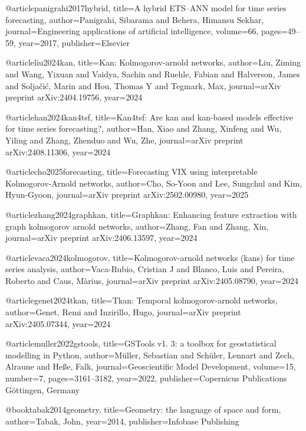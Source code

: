 @article{panigrahi2017hybrid,
  title={A hybrid ETS--ANN model for time series forecasting},
  author={Panigrahi, Sibarama and Behera, Himansu Sekhar},
  journal={Engineering applications of artificial intelligence},
  volume={66},
  pages={49--59},
  year={2017},
  publisher={Elsevier}
}

@article{liu2024kan,
  title={Kan: Kolmogorov-arnold networks},
  author={Liu, Ziming and Wang, Yixuan and Vaidya, Sachin and Ruehle, Fabian and Halverson, James and Solja{\v{c}}i{\'c}, Marin and Hou, Thomas Y and Tegmark, Max},
  journal={arXiv preprint arXiv:2404.19756},
  year={2024}
}

@article{han2024kan4tsf,
  title={Kan4tsf: Are kan and kan-based models effective for time series forecasting?},
  author={Han, Xiao and Zhang, Xinfeng and Wu, Yiling and Zhang, Zhenduo and Wu, Zhe},
  journal={arXiv preprint arXiv:2408.11306},
  year={2024}
}

@article{cho2025forecasting,
  title={Forecasting VIX using interpretable Kolmogorov-Arnold networks},
  author={Cho, So-Yoon and Lee, Sungchul and Kim, Hyun-Gyoon},
  journal={arXiv preprint arXiv:2502.00980},
  year={2025}
}

@article{zhang2024graphkan,
  title={Graphkan: Enhancing feature extraction with graph kolmogorov arnold networks},
  author={Zhang, Fan and Zhang, Xin},
  journal={arXiv preprint arXiv:2406.13597},
  year={2024}
}

@article{vaca2024kolmogorov,
  title={Kolmogorov-arnold networks (kans) for time series analysis},
  author={Vaca-Rubio, Cristian J and Blanco, Luis and Pereira, Roberto and Caus, M{\`a}rius},
  journal={arXiv preprint arXiv:2405.08790},
  year={2024}
}

@article{genet2024tkan,
  title={Tkan: Temporal kolmogorov-arnold networks},
  author={Genet, Remi and Inzirillo, Hugo},
  journal={arXiv preprint arXiv:2405.07344},
  year={2024}
}

@article{muller2022gstools,
  title={GSTools v1. 3: a toolbox for geostatistical modelling in Python},
  author={M{\"u}ller, Sebastian and Sch{\"u}ler, Lennart and Zech, Alraune and He{\ss}e, Falk},
  journal={Geoscientific Model Development},
  volume={15},
  number={7},
  pages={3161--3182},
  year={2022},
  publisher={Copernicus Publications G{\"o}ttingen, Germany}
}

@book{tabak2014geometry,
  title={Geometry: the language of space and form},
  author={Tabak, John},
  year={2014},
  publisher={Infobase Publishing}
}

